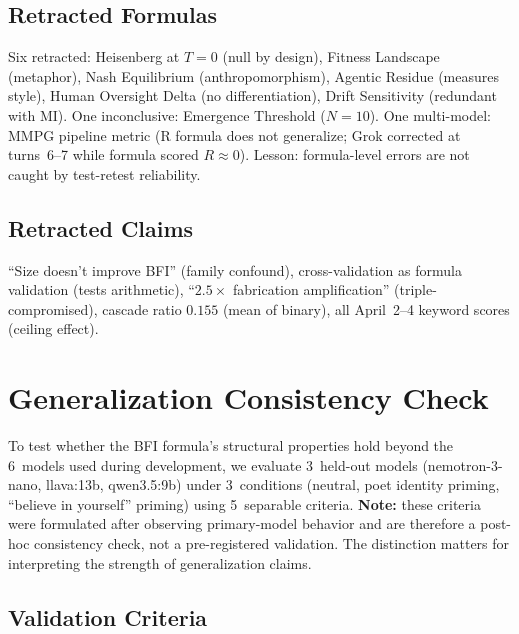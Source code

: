 \documentclass[11pt,a4paper]{article}
\begin{document}
\subsection{Retracted Formulas}
Six retracted: Heisenberg at $T=0$ (null by design), Fitness Landscape (metaphor), Nash Equilibrium (anthropomorphism), Agentic Residue (measures style), Human Oversight Delta (no differentiation), Drift Sensitivity (redundant with MI). One inconclusive: Emergence Threshold ($N=10$). One multi-model: MMPG pipeline metric (R formula does not generalize; Grok corrected at turns~6--7 while formula scored $R \approx 0$). Lesson: formula-level errors are not caught by test-retest reliability.

\subsection{Retracted Claims}
``Size doesn't improve BFI'' (family confound), cross-validation as formula validation (tests arithmetic), ``$2.5\times$ fabrication amplification'' (triple-compromised), cascade ratio $0.155$ (mean of binary), all April~2--4 keyword scores (ceiling effect).

\section{Generalization Consistency Check}
\label{sec:heldout}

To test whether the BFI formula's structural properties hold beyond the 6~models used during development, we evaluate 3~held-out models (nemotron-3-nano, llava:13b, qwen3.5:9b) under 3~conditions (neutral, poet identity priming, ``believe in yourself'' priming) using 5~separable criteria. \textbf{Note:} these criteria were formulated after observing primary-model behavior and are therefore a post-hoc consistency check, not a pre-registered validation. The distinction matters for interpreting the strength of generalization claims.

\subsection{Validation Criteria}
\end{document}
